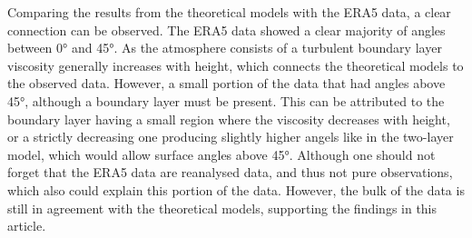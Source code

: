 

Comparing the results from the theoretical models with the ERA5 data, a clear connection can be observed. The ERA5 data showed a clear majority of angles between \ang{0} and \ang{45}. As the atmosphere consists of a turbulent boundary layer viscosity generally increases with height, which connects the theoretical models to the observed data. However, a small portion of the data that had angles above \ang{45}, although a boundary layer must be present. This can be attributed to the boundary layer having a small region where the viscosity decreases with height, or a strictly decreasing one producing slightly higher angels like in the two-layer model, which would allow surface angles above \ang{45}. Although one should not forget that the ERA5 data are reanalysed data, and thus not pure observations, which also could explain this portion of the data. However, the bulk of the data is still in agreement with the theoretical models, supporting the findings in this article.

